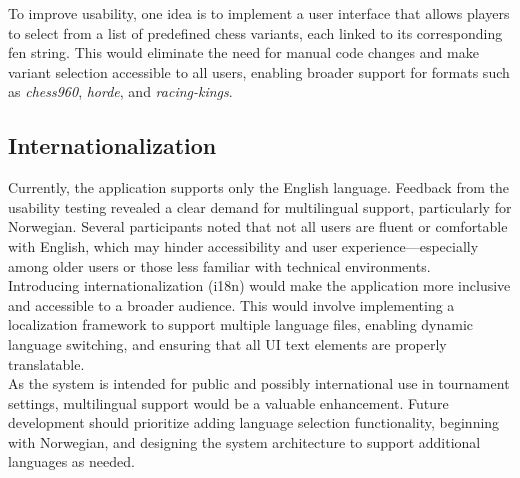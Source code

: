 To improve usability, one idea is to implement a user interface that allows players to select from a list of predefined chess variants, each linked to its corresponding \gls{fen} string. This would eliminate the need for manual code changes and make variant selection accessible to all users, enabling broader support for formats such as \textit{\gls{chess960}}, \textit{\gls{horde}}, and \textit{\gls{racing-kings}}.

\subsection{Internationalization}
Currently, the application supports only the English language. Feedback from the usability testing revealed a clear demand for multilingual support, particularly for Norwegian. Several participants noted that not all users are fluent or comfortable with English, which may hinder accessibility and user experience—especially among older users or those less familiar with technical environments. \\

Introducing internationalization (i18n) would make the application more inclusive and accessible to a broader audience. This would involve implementing a localization framework to support multiple language files, enabling dynamic language switching, and ensuring that all UI text elements are properly translatable. \\

As the system is intended for public and possibly international use in tournament settings, multilingual support would be a valuable enhancement. Future development should prioritize adding language selection functionality, beginning with Norwegian, and designing the system architecture to support additional languages as needed.
